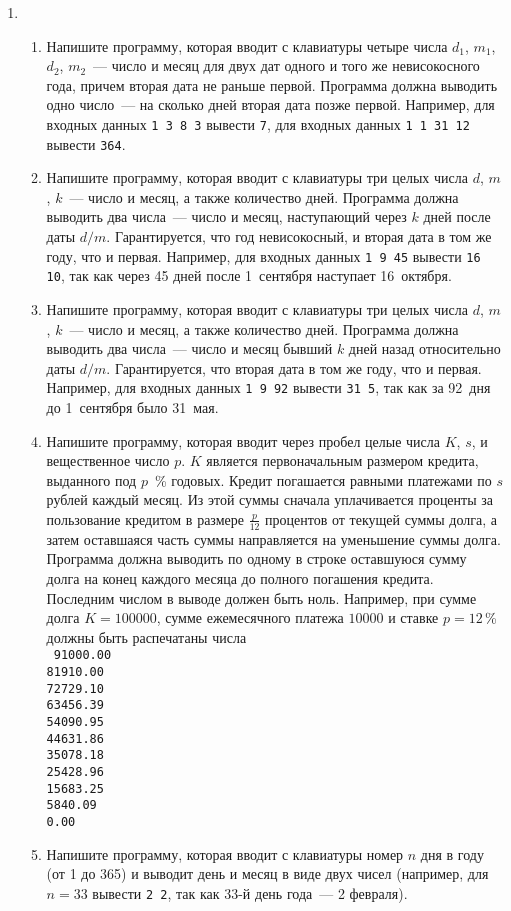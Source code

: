 \documentclass{article}
\begin{document}
\begin{enumerate}[label={}, leftmargin=0pt, itemindent=0pt]
\item

\begin{enumerate}[label=\arabic{enumi}.\arabic*.]
\item
Напишите программу, которая вводит с клавиатуры четыре числа $d_1$, $m_1$, $d_2$, $m_2$~--- число и месяц для двух дат одного и того же невисокосного года, причем вторая дата не раньше первой. Программа должна выводить одно число~--- на сколько дней вторая дата позже первой. Например, для входных данных \texttt{1 3 8 3} вывести \texttt{7}, для входных данных \texttt{1 1 31 12} вывести \texttt{364}.
\item
Напишите программу, которая вводит с клавиатуры три целых числа $d$, $m$, $k$~--- число и месяц, а также количество дней. Программа должна выводить два числа~--- число и месяц, наступающий через $k$ дней после даты $d/m$. Гарантируется, что год невисокосный, и вторая дата в том же году, что и первая. Например, для входных данных \texttt{1 9 45} вывести \texttt{16 10}, так как через 45 дней после 1~сентября наступает 16~октября.
\item
Напишите программу, которая вводит с клавиатуры три целых числа $d$, $m$, $k$~--- число и месяц, а также количество дней. Программа должна выводить два числа~--- число и месяц бывший $k$ дней назад относительно даты $d/m$. Гарантируется, что вторая дата в том же году, что и первая. Например, для входных данных \texttt{1 9 92} вывести \texttt{31 5}, так как за 92~дня до 1~сентября было 31~мая.
\item
Напишите программу, которая вводит через пробел целые числа $K$, $s$, и вещественное число $p$. $K$ является первоначальным размером кредита, выданного под $p$~\% годовых. Кредит погашается равными платежами по $s$ рублей каждый месяц. Из этой суммы сначала уплачивается проценты за пользование кредитом в размере $\frac{p}{12}$ процентов от текущей суммы долга, а затем оставшаяся часть суммы  направляется на уменьшение суммы долга. Программа должна выводить по одному в строке оставшуюся сумму долга на конец каждого месяца до полного погашения кредита. Последним числом в выводе должен быть ноль. Например, при сумме долга $K=100000$, сумме ежемесячного платежа $10000$ и ставке $p=12$\,\%  должны быть распечатаны числа\\
\texttt{
91000.00\\
81910.00\\
72729.10\\
63456.39\\
54090.95\\
44631.86\\
35078.18\\
25428.96\\
15683.25\\
5840.09\\
0.00}
\item
Напишите программу, которая вводит с клавиатуры номер $n$ дня в году (от 1 до 365) и выводит день и месяц в виде двух чисел (например, для $n=33$ вывести \texttt{2 2}, так как 33-й день года~--- 2 февраля).


\end{enumerate}
\end{enumerate}
\end{document}
